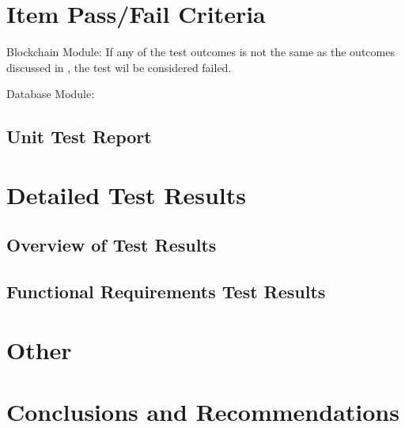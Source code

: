 \documentclass[11pt]{article}
\begin{document}
	
	
	
	\section{Item Pass/Fail Criteria}
	Blockchain Module:\newline
	If any of the test outcomes is not the same as the outcomes discussed in , the test wil be considered failed.
	
	Database Module:\newline
	

	\newpage
	\begin{center}
		\section*{Unit Test Report}
	\end{center}
	
	\section{Detailed Test Results}
	\label{sec:DetailedTestResults}
		
	\subsection{Overview of Test Results}
	
	\subsection{Functional Requirements Test Results}
	
	\newpage
	
	\section{Other}
	
	\section{Conclusions and Recommendations}
	
\end{document}
